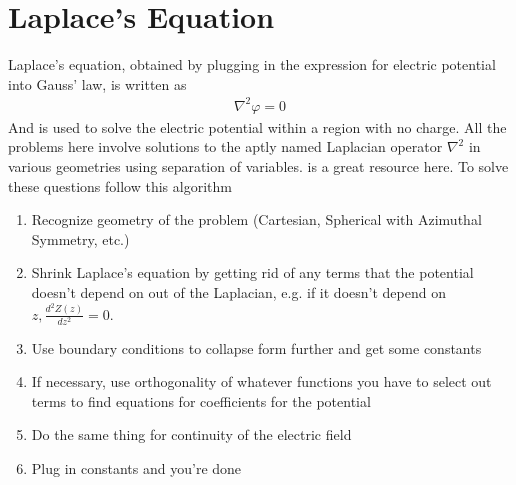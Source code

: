 \section{Laplace's Equation}
Laplace's equation, obtained by plugging in the expression for electric potential into Gauss' law, is written as 
\begin{align}
\nabla^2\varphi = 0
\end{align}
And is used to solve the electric potential within a region with no charge. All the problems here involve solutions to the aptly named Laplacian operator $\nabla^2$ in various geometries using separation of variables.\cite{zangwill} is a great resource here. To solve these questions follow this algorithm
\begin{enumerate}
\item Recognize geometry of the problem (Cartesian, Spherical with Azimuthal Symmetry, etc.)
\item Shrink Laplace's equation by getting rid of any terms that the potential doesn't depend on out of the Laplacian, e.g. if it doesn't depend on $z, \frac{d^2 Z(z)}{dz^2} = 0$.

\item Use boundary conditions to collapse form further and get some constants

\item If necessary, use orthogonality of whatever functions you have to select out terms to find equations for coefficients for the potential

\item Do the same thing for continuity of the electric field

\item Plug in constants and you're done


\end{enumerate}



